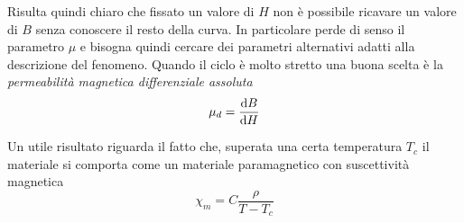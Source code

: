 Risulta quindi chiaro che fissato un valore di $H$ non è possibile ricavare un valore di $B$ senza conoscere il
resto della curva. In particolare perde di senso il parametro $\mu$ e bisogna quindi cercare dei parametri
alternativi adatti alla descrizione del fenomeno. Quando il ciclo è molto stretto una buona scelta è
la \textit{permeabilità magnetica differenziale assoluta}
\[
    \mu_d=\dv{B}{H}
\]

Un utile risultato riguarda il fatto che, superata una certa temperatura $T_c$ il materiale si comporta come
un materiale paramagnetico con suscettività magnetica
\[
    \chi_m=C\frac{\rho}{T-T_c}
\]
